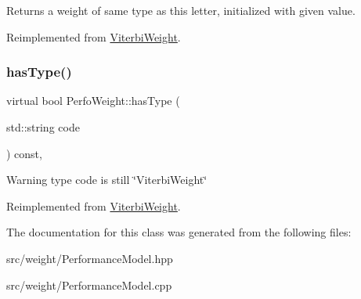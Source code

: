 \begin{DoxyReturn}{Returns}
a weight of same type as this letter, initialized with given value. 
\end{DoxyReturn}


Reimplemented from \mbox{\hyperlink{classViterbiWeight_a8b4676e41a4edb2cc5466d1e8cb1059a}{Viterbi\+Weight}}.

\mbox{\label{classPerfoWeight_a170351b18fd33ea7753d8b82eb83ae9e}} 
\subsubsection{\texorpdfstring{hasType()}{hasType()}}
{\footnotesize\ttfamily virtual bool Perfo\+Weight\+::has\+Type (\begin{DoxyParamCaption}\item[{std\+::string}]{code }\end{DoxyParamCaption}) const\hspace{0.3cm}{\ttfamily [inline]}, {\ttfamily [virtual]}}

\begin{DoxyWarning}{Warning}
type code is still \char`\"{}\+Viterbi\+Weight\char`\"{} 
\end{DoxyWarning}


Reimplemented from \mbox{\hyperlink{classViterbiWeight}{Viterbi\+Weight}}.



The documentation for this class was generated from the following files\+:\begin{DoxyCompactItemize}
\item 
src/weight/Performance\+Model.\+hpp\item 
src/weight/Performance\+Model.\+cpp\end{DoxyCompactItemize}
